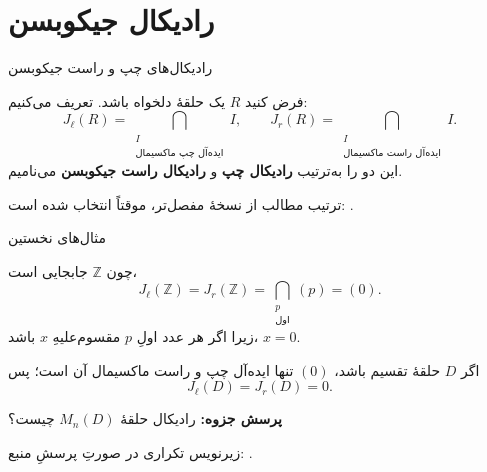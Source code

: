\section{رادیکال جیکوبسن}

\begin{frame}[t]{رادیکال‌های چپ و راست جیکوبسن}
\label{lec15:radical-definitions}
\begin{definition}
فرض کنید \(R\) یک حلقهٔ دلخواه باشد. تعریف می‌کنیم:
\[
 J_\ell(R)=\bigcap_{\substack{I\\\text{ایده‌آل چپ ماکسیمال}}} I,
 \qquad
 J_r(R)=\bigcap_{\substack{I\\\text{ایده‌آل راست ماکسیمال}}} I.
\]
این دو را به‌ترتیب \textbf{رادیکال چپ} و \textbf{رادیکال راست جیکوبسن} می‌نامیم.
\end{definition}
ترتیب مطالب از نسخهٔ مفصل‌تر، موقتاً انتخاب شده است: .
\end{frame}

\begin{frame}[t]{مثال‌های نخستین}
\label{lec15:radical-examples}
\begin{example}
چون \(\mathbb Z\) جابجایی است،
\[
 J_\ell(\mathbb Z)=J_r(\mathbb Z)
 =\bigcap_{\substack{p\\\text{اول}}}(p)=(0).
\]
زیرا اگر هر عدد اولِ \(p\) مقسوم‌علیهِ \(x\) باشد، \(x=0\).
\end{example}
\begin{example}
اگر \(D\) حلقهٔ تقسیم باشد، \((0)\) تنها ایده‌آل چپ و راست ماکسیمال آن است؛ پس
\[
 J_\ell(D)=J_r(D)=0.
\]
\end{example}
\textbf{پرسش جزوه:} رادیکال حلقهٔ \(M_n(D)\) چیست؟
\par\alert{زیرنویس تکراری در صورتِ پرسشِ منبع: .}
\end{frame}

